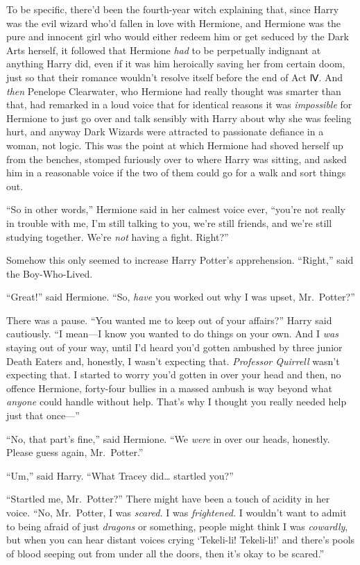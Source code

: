 To be specific, there'd been the fourth-year witch explaining that,
since Harry was the evil wizard who'd fallen in love with Hermione, and
Hermione was the pure and innocent girl who would either redeem him or
get seduced by the Dark Arts herself, it followed that Hermione
\emph{had} to be perpetually indignant at anything Harry did, even if it
was him heroically saving her from certain doom, just so that their
romance wouldn't resolve itself before the end of Act Ⅳ. And \emph{then}
Penelope Clearwater, who Hermione had really thought was smarter than
that, had remarked in a loud voice that for identical reasons it was
\emph{impossible} for Hermione to just go over and talk sensibly with
Harry about why she was feeling hurt, and anyway Dark Wizards were
attracted to passionate defiance in a woman, not logic. This was the
point at which Hermione had shoved herself up from the benches, stomped
furiously over to where Harry was sitting, and asked him in a reasonable
voice if the two of them could go for a walk and sort things out.

``So in other words,'' Hermione said in her calmest voice ever, ``you're
not really in trouble with me, I'm still talking to you, we're still
friends, and we're still studying together. We're \emph{not} having a
fight. Right?''

Somehow this only seemed to increase Harry Potter's apprehension.
``Right,'' said the Boy-Who-Lived.

``Great!'' said Hermione. ``So, \emph{have} you worked out why I was
upset, Mr.~Potter?''

There was a pause. ``You wanted me to keep out of your affairs?'' Harry
said cautiously. ``I mean---I know you wanted to do things on your own.
And I \emph{was} staying out of your way, until I'd heard you'd gotten
ambushed by three junior Death Eaters and, honestly, I wasn't expecting
that. \emph{Professor Quirrell} wasn't expecting that. I started to
worry you'd gotten in over your head and then, no offence Hermione,
forty-four bullies in a massed ambush is way beyond what \emph{anyone}
could handle without help. That's why I thought you really needed help
just that once---''

``No, that part's fine,'' said Hermione. ``We \emph{were} in over our
heads, honestly. Please guess again, Mr.~Potter.''

``Um,'' said Harry. ``What Tracey did\ldots{} startled you?''

``Startled me, Mr.~Potter?'' There might have been a touch of acidity in
her voice. ``No, Mr.~Potter, I was \emph{scared.} I was
\emph{frightened.} I wouldn't want to admit to being afraid of just
\emph{dragons} or something, people might think I was \emph{cowardly},
but when you can hear distant voices crying `Tekeli-li! Tekeli-li!' and
there's pools of blood seeping out from under all the doors, then it's
okay to be scared.''

